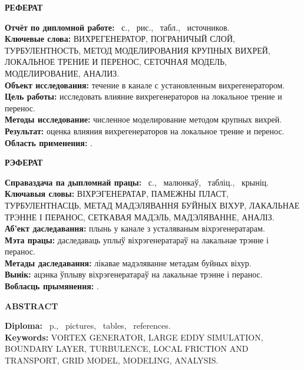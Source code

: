 \newpage
\tableofcontents
\newpage
\begin{center}
	\textbf{\MakeUppercase{реферат}}
\end{center}
\textbf{Отчёт по дипломной работе:} \pageref*{LastPage}~с., \totfig~рис., \tottab~табл., \totref~источников.\\
\textbf{Ключевые слова:} \MakeUppercase{вихрегенератор, пограничый слой, турбулентность, метод моделирования крупных вихрей, локальное трение и перенос, сеточная модель, моделирование, анализ}.\\
\textbf{Объект исследования:} течение в канале с установленным вихрегенератором.\\
\textbf{Цель работы:} исследовать влияние вихрегенераторов на локальное трение и перенос.\\
\textbf{Методы исследование:} численное моделирование методом крупных вихрей.\\
\textbf{Результат:} оценка влияния вихрегенераторов на локальное трение и перенос.\\
\textbf{Область применения:} .\\
\newpage
\begin{center}
	\textbf{\MakeUppercase{рэферат}}
\end{center}
\textbf{Справаздача па дыпломнай працы:} \pageref*{LastPage}~с., \totfig~малюнкаў, \tottab~табліц., \totref~крыніц.\\
\textbf{Ключавыя словы:} \MakeUppercase{віхрэгенератар, памежны пласт, турбулентнасць, метад мадэлявання буйных віхур, лакальнае трэнне і перанос, сеткавая мадэль, мадэляванне, аналіз}.\\
\textbf{Аб'ект даследавання:} плынь у канале з усталяваным віхрэгенератарам.\\
\textbf{Мэта працы:} даследаваць уплыў віхрэгенератараў на лакальнае трэнне і перанос.\\
\textbf{Метады даследавання:} лікавае мадэляванне метадам буйных віхур.\\
\textbf{Вынік:} ацэнка ўплыву віхрэгенератараў на лакальнае трэнне і перанос.\\
\textbf{Вобласць прымянення:} .\\
\newpage
\begin{center}
	\textbf{\MakeUppercase{abstract}}
\end{center}
\textbf{Diploma:} \pageref*{LastPage}~p., \totfig~pictures, \tottab~tables, \totref~references.\\
\textbf{Keywords:} \MakeUppercase{vortex generator, large eddy simulation, boundary layer, turbulence, local friction and transport, grid model, modeling, analysis}.\\
